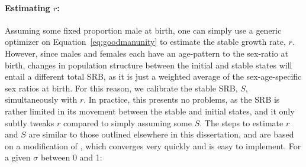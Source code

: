 \paragraph{Estimating $r$: } 
Assuming some fixed proportion male at birth, one can simply use a generic
optimizer on Equation~\eqref{eq:goodmanunity} to estimate the stable growth
rate, $r$. However, since males and females each have an age-pattern to
the sex-ratio at birth, changes in population structure between the initial and
stable states will entail a different total SRB, as it is just a weighted
average of the sex-age-specific sex ratios at birth. For this reason, we 
calibrate the stable SRB, $S$, simultaneously with $r$. In
practice, this presents no problems, as the SRB is rather limited in its
movement between the stable and initial states, and it only subtly tweaks $r$
compared to simply assuming some $S$. The steps to estimate $r$ and $S$ are
similar to those outlined elsewhere in this dissertation, and are based on a
modification of \citet{coale1957new}, which converges very quickly and is easy
to implement. For a given $\sigma$ between 0 and 1:

